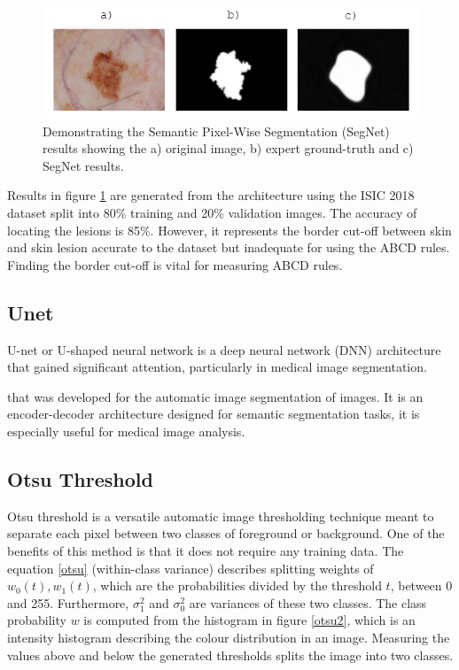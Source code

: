 


\begin{figure}[hb]
\centering
\includegraphics[scale=1.2]{images/border-seg.png}
\caption{Demonstrating the Semantic Pixel-Wise Segmentation (SegNet) results showing the a) original image, b) expert ground-truth and c) SegNet results.}\label{SegNet}
\end{figure}

Results in figure \ref{SegNet} are generated from the architecture using the ISIC 2018 dataset split into 80\% training and 20\% validation images. The accuracy of locating the lesions is 85\%. However, it represents the border cut-off between skin and skin lesion accurate to the dataset but inadequate for using the ABCD rules. Finding the border cut-off is vital for measuring ABCD rules\cite{Pereira2020}.

\subsection{Unet}
U-net or U-shaped neural network is a deep neural network (DNN) architecture that gained significant attention, particularly in medical image segmentation. 


that was developed for the automatic image segmentation of images. It is an encoder-decoder architecture designed for semantic segmentation tasks, it is especially useful for medical image analysis\cite{zhou2020}.  

\subsection{Otsu Threshold}
Otsu threshold is a versatile automatic image thresholding technique meant to separate each pixel between two classes of foreground or background. One of the benefits of this method is that it does not require any training data. The equation \ref{otsu} (within-class variance) describes splitting weights of $w_0(t),w_1(t)$, which are the probabilities divided by the threshold $t$, between 0 and 255. Furthermore, $\sigma_1^2$ and $\sigma_0^2$ are variances of these two classes. The class probability $w$ is computed from the histogram in figure \ref{otsu2}, which is an intensity histogram describing the colour distribution in an image. Measuring the values above and below the generated thresholds splits the image into two classes.


